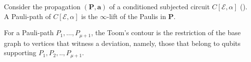 \begin{definition}
  \label{def:paulipath}
  Consider the propagation $(\mathbf{P},\mathbf{a})$ of a conditioned subjected circuit $C[\mathcal{E},\alpha]$ (). A Pauli-path of $C[\mathcal{E},\alpha]$ is the $\infty$-lift of the Paulis in $\mathbf{P}$.
 

\end{definition}


For a Pauli-path $P_{1}, \ldots ,P_{\mu+1}$, the Toom's contour is the restriction of the base graph to vertices that witness a deviation, namely, those that belong to qubits supporting $P_{1},P_{2},..,P_{\mu+1}$. 


